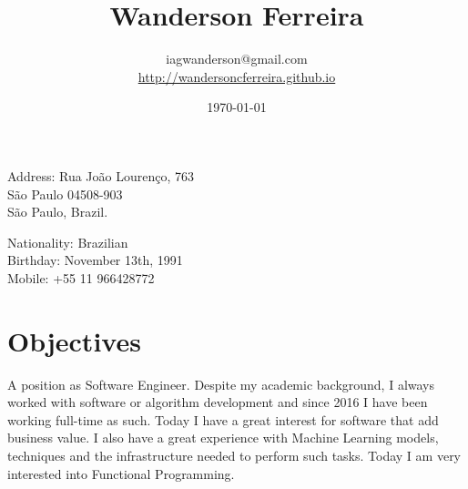 \documentclass[10pt]{article}
\title{\bfseries\Huge Wanderson Ferreira}
\author{iagwanderson@gmail.com \\
\href{http://wandersoncferreira.github.io}{http://wandersoncferreira.github.io}}
\date{\today}
\begin{document}
\maketitle

\begin{center}
  \begin{minipage}{.7\textwidth}
    Address: Rua João Lourenço, 763\\
    São Paulo 04508-903\\
    São Paulo, Brazil.
  \end{minipage}%
  \begin{minipage}{.5\textwidth}
    Nationality: Brazilian\\
    Birthday: November 13th, 1991\\
    Mobile: +55 11 966428772
  \end{minipage}
\end{center}

\section*{Objectives}
A position as Software Engineer. Despite my academic background, I always worked
with software or algorithm development and since 2016 I have been working
full-time as such. Today I have a great interest for software that add business
value. I also have a great experience with Machine Learning models, techniques
and the infrastructure needed to perform such tasks. Today I am very interested
into Functional Programming.
\end{document}
